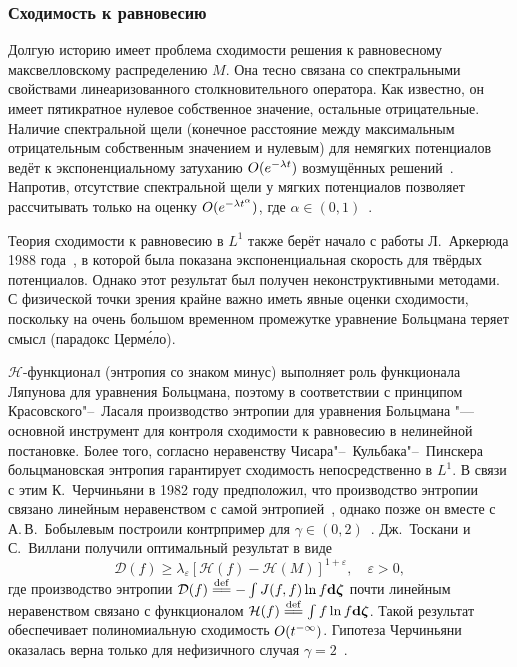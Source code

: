 \subsubsection{Сходимость к равновесию}

Долгую историю имеет проблема сходимости решения к равновесному максвелловскому распределению \(M\).
Она тесно связана со спектральными свойствами линеаризованного столкновительного оператора.
Как известно, он имеет пятикратное нулевое собственное значение, остальные отрицательные.
Наличие спектральной щели (конечное расстояние между максимальным отрицательным собственным значением и нулевым)
для немягких потенциалов ведёт к экспоненциальному затуханию \(O(e^{-\lambda t})\) возмущённых решений~\cite{Grad1963b}.
Напротив, отсутствие спектральной щели у мягких потенциалов позволяет рассчитывать только на оценку \(O(e^{-\lambda t^\alpha})\),
где \(\alpha\in(0,1)\)~\cite{Caflisch1980a}.

Теория сходимости к равновесию в \(L^1\) также берёт начало с работы Л.~Аркерюда 1988 года~\cite{Arkeryd1988},
в которой была показана экспоненциальная скорость для твёрдых потенциалов.
Однако этот результат был получен неконструктивными методами.
С физической точки зрения крайне важно иметь явные оценки сходимости, поскольку на очень большом временном промежутке
уравнение Больцмана теряет смысл (парадокс Церм\'{е}ло).

\(\mathcal{H}\)-функционал (энтропия со знаком минус) выполняет роль функционала Ляпунова для уравнения Больцмана,
поэтому в соответствии с принципом Красовского"--~Ласаля производство энтропии для уравнения Больцмана
"--- основной инструмент для контроля сходимости к равновесию в нелинейной постановке.
Более того, согласно неравенству Чисара"--~Кульбака"--~Пинскера больцмановская энтропия
гарантирует сходимость непосредственно в \(L^1\).
В связи с этим К.~Черчиньяни в 1982 году предположил, что производство энтропии связано
линейным неравенством с самой энтропией~\cite{Cercignani1982, Desvillettes2011},
однако позже он вместе с А.\,В.~Бобылевым построили контрпример для \(\gamma\in(0,2)\)~\cite{Bobylev1999}.
Дж.~Тоскани и С.~Виллани получили оптимальный результат в виде~\cite{Toscani1999, Toscani2000, Villani2003}
\begin{equation*}
    \mathcal{D}(f) \geq \lambda_\varepsilon \left[ \mathcal{H}(f) - \mathcal{H}(M) \right]^{1+\varepsilon},
    \quad \varepsilon > 0,
\end{equation*}
где производство энтропии \(\mathcal{D}(f) \eqdef -\int J(f,f) \ln f \dzeta\) почти линейным неравенством связано
с функционалом \(\mathcal{H}(f) \eqdef \int f\ln f \dzeta\).
Такой результат обеспечивает полиномиальную сходимость \(O(t^{-\infty})\).
Гипотеза Черчиньяни оказалась верна только для нефизичного случая \(\gamma=2\)~\cite{Villani2003}.

